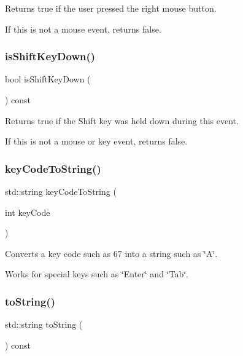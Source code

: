Returns true if the user pressed the right mouse button. 

If this is not a mouse event, returns false. \mbox{\label{classGEvent_a814434d4ee5d0792e2c9ffdf8433766c}} 
\subsubsection{\texorpdfstring{is\+Shift\+Key\+Down()}{isShiftKeyDown()}}
{\footnotesize\ttfamily bool is\+Shift\+Key\+Down (\begin{DoxyParamCaption}{ }\end{DoxyParamCaption}) const\hspace{0.3cm}{\ttfamily [virtual]}}



Returns {\ttfamily true} if the Shift key was held down during this event. 

If this is not a mouse or key event, returns false. \mbox{\label{classGEvent_a6e882459d29785fb753a3bf23f29cbc3}} 
\subsubsection{\texorpdfstring{key\+Code\+To\+String()}{keyCodeToString()}}
{\footnotesize\ttfamily std\+::string key\+Code\+To\+String (\begin{DoxyParamCaption}\item[{int}]{key\+Code }\end{DoxyParamCaption})\hspace{0.3cm}{\ttfamily [static]}}



Converts a key code such as 67 into a string such as \char`\"{}\+A\char`\"{}. 

Works for special keys such as \char`\"{}\+Enter\char`\"{} and \char`\"{}\+Tab\char`\"{}. \mbox{\label{classGEvent_a1fe5121d6528fdea3f243321b3fa3a49}} 
\subsubsection{\texorpdfstring{to\+String()}{toString()}}
{\footnotesize\ttfamily std\+::string to\+String (\begin{DoxyParamCaption}{ }\end{DoxyParamCaption}) const\hspace{0.3cm}{\ttfamily [virtual]}}



